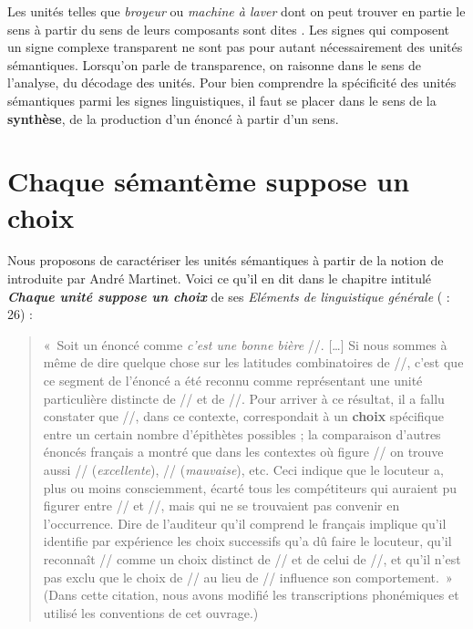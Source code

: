 Les unités telles que \textit{broyeur} ou \textit{machine à laver} dont on peut trouver en partie le sens à partir du sens de leurs composants sont dites . Les signes qui composent un signe complexe transparent ne sont pas pour autant nécessairement des unités sémantiques. Lorsqu’on parle de transparence, on raisonne dans le sens de l’analyse, du décodage des unités. Pour bien comprendre la spécificité des unités sémantiques parmi les signes linguistiques, il faut se placer dans le sens de la \textbf{synthèse}, de la production d’un énoncé à partir d’un sens.

\section{Chaque sémantème suppose un choix}\label{sec:2.3.1}

Nous proposons de caractériser les unités sémantiques à partir de la notion de  introduite par André Martinet. Voici ce qu’il en dit dans le chapitre intitulé \textbf{\textit{Chaque unité suppose un choix}} de ses \textit{Eléments de linguistique générale} (\citeyear{martinet1960elements} : 26) :

\begin{quote}
    «~Soit un énoncé comme \textit{c’est une bonne bière} //. […] Si nous sommes à même de dire quelque chose sur les latitudes combinatoires de //, c’est que ce segment de l’énoncé a été reconnu comme représentant une unité particulière distincte de // et de //. Pour arriver à ce résultat, il a fallu constater que //, dans ce contexte, correspondait à un \textbf{choix} spécifique entre un certain nombre d’épithètes possibles ; la comparaison d’autres énoncés français a montré que dans les contextes où figure // on trouve aussi // (\textit{excellente}), // (\textit{mauvaise}), etc. Ceci indique que le locuteur a, plus ou moins consciemment, écarté tous les compétiteurs qui auraient pu figurer entre // et //, mais qui ne se trouvaient pas convenir en l’occurrence. Dire de l’auditeur qu’il comprend le français implique qu’il identifie par expérience les choix successifs qu’a dû faire le locuteur, qu’il reconnaît // comme un choix distinct de // et de celui de //, et qu’il n’est pas exclu que le choix de // au lieu de // influence son comportement.~» (Dans cette citation, nous avons modifié les transcriptions phonémiques et utilisé les conventions de cet ouvrage.)
\end{quote}

